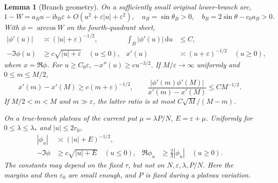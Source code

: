 \documentclass[11pt]{article}
\numberwithin{equation}{section}
\newtheorem{lemma}[theorem]{Lemma}
\theoremstyle{definition}
\newcommand{\dd}{\,\mathrm d}
\newcommand{\ii}{\mathrm i}
\newcommand{\eps}{\varepsilon}
\begin{document}
\begin{lemma}[Branch geometry]\label{lem:branch}
On a sufficiently small original lower-branch arc,
\[
 1-W=a_Bu-\ii b_B\eps+O(u^2+\eps|u|+\eps^2),
 \quad a_B=\sin\theta_B>0,\quad b_B=2\sin\theta-c_0a_B>0.
\]
With \(\phi=\arccos W\) on the fourth-quadrant sheet,
\begin{align*}
 |\phi'(u)|&\asymp(|u|+\eps)^{-1/2},&
 \int_B|\phi'(u)|\dd u&\le C,\\
 -\Im\phi(u)&\ge c\sqrt{|u|+\eps}\quad(u\le0),&
 x'(u)&\asymp(u+\eps)^{-1/2}\quad(u\ge0),
\end{align*}
where \(x=\Re\phi\).
For \(u\ge C_0\eps\), \(-x''(u)\ge c u^{-3/2}\).
If \(M/\eps\to\infty\) uniformly and \(0\le m\le M/2\),
\[
 x'(m)-x'(M)\ge c(m+\eps)^{-1/2},\qquad
 \frac{|\phi'(m)\phi'(M)|}{x'(m)-x'(M)}\le C M^{-1/2}.
\]
If \(M/2<m<M\) and \(m\gg\eps\), the latter ratio is at most
\(C\sqrt M/(M-m)\).

On a true-branch plateau of the current put
\(\mu=\lambda P/N\), \(E=\eps+\mu\). Uniformly for
\(0\le\lambda\le\lambda_*\) and \(|u|\le2r_0\),
\begin{align*}
 |\phi_u|&\asymp(|u|+E)^{-1/2},\\
 -\Im\phi&\ge c\sqrt{|u|+E}\quad(u\le0),&
 \Re\phi_u&\ge\tfrac23|\phi_u|\quad(u\ge0).
\end{align*}
The constants may depend on the fixed \(\tau\), but not on
\(N,\eps,\lambda,P/N\). Here the margins and then \(\eps_0\)
are small enough, and \(P\) is fixed during a plateau variation.
\end{lemma}
\end{document}
